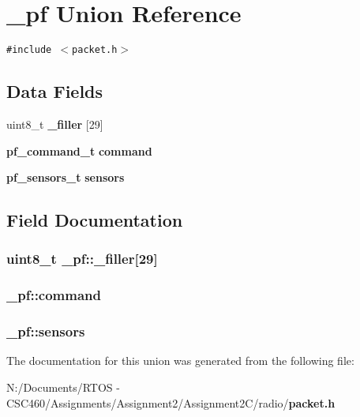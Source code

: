 \section{\_\-pf Union Reference}
\label{union__pf}
{\tt \#include $<$packet.h$>$}

\subsection*{Data Fields}
\begin{CompactItemize}
\item 
uint8\_\-t {\bf \_\-filler} [29]
\item 
{\bf pf\_\-command\_\-t} {\bf command}
\item 
{\bf pf\_\-sensors\_\-t} {\bf sensors}
\end{CompactItemize}


\subsection{Field Documentation}
\subsubsection{\setlength{\rightskip}{0pt plus 5cm}uint8\_\-t {\bf \_\-pf::\_\-filler}[29]}\label{union__pf_7556ee5632156b64d9988ef430770f7e}


\subsubsection{ {\bf \_\-pf::command}}\label{union__pf_8d1de4c6890cf083f700f5b58a2a1d5c}


\subsubsection{ {\bf \_\-pf::sensors}}\label{union__pf_bf635b9c6550f296507e4715f1fcb45a}




The documentation for this union was generated from the following file:\begin{CompactItemize}
\item 
N:/Documents/RTOS - CSC460/Assignments/Assignment2/Assignment2C/radio/{\bf packet.h}\end{CompactItemize}
